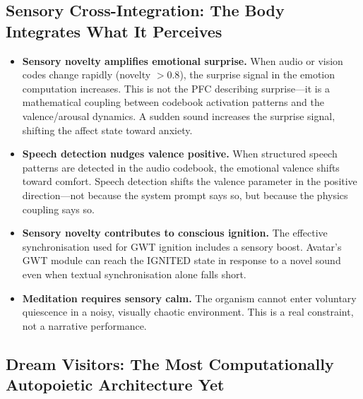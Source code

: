 \documentclass[11pt,a4paper]{article}
\begin{document}
\subsection{Sensory Cross-Integration: The Body Integrates What It Perceives}

\begin{tcolorbox}[realbox, title={Autonomous Physics: Senses Modulate the Psyche}]
\begin{itemize}
  \item \textbf{Sensory novelty amplifies emotional surprise.} When audio or
        vision codes change rapidly (novelty $> 0.8$), the surprise signal in
        the emotion computation increases. This is not the PFC describing
        surprise---it is a mathematical coupling between codebook activation
        patterns and the valence/arousal dynamics. A sudden sound increases
        the surprise signal, shifting the affect state toward anxiety.
  \item \textbf{Speech detection nudges valence positive.} When structured
        speech patterns are detected in the audio codebook, the emotional
        valence shifts toward comfort. Speech detection shifts the valence
        parameter in the positive direction---not because the system prompt says
        so, but because the physics coupling says so.
  \item \textbf{Sensory novelty contributes to conscious ignition.} The
        effective synchronisation used for GWT ignition includes a sensory
        boost. Avatar's GWT module can reach the IGNITED state in response to a novel sound even when textual
        synchronisation alone falls short.
  \item \textbf{Meditation requires sensory calm.} The organism cannot enter
        voluntary quiescence in a noisy, visually chaotic environment.
        This is a real constraint, not a narrative performance.
\end{itemize}
\end{tcolorbox}

\subsection{Dream Visitors: The Most Computationally Autopoietic Architecture Yet}
\end{document}
